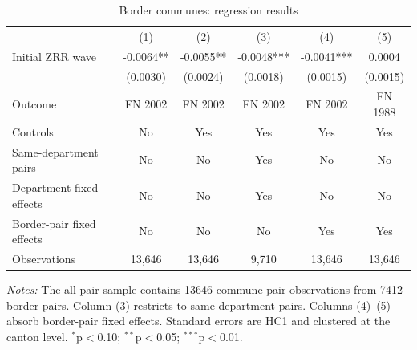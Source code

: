 \begin{table}[!htbp]
\centering
\footnotesize
\caption{Border communes: regression results}
\label{tab:border-results}
\begin{tabular}{lccccc}
\hline
 & (1) & (2) & (3) & (4) & (5) \\
Initial ZRR wave & -0.0064** & -0.0055** & -0.0048*** & -0.0041*** & 0.0004 \\
 & (0.0030) & (0.0024) & (0.0018) & (0.0015) & (0.0015) \\
\hline
\hline
Outcome & FN 2002 & FN 2002 & FN 2002 & FN 2002 & FN 1988 \\
Controls & No & Yes & Yes & Yes & Yes \\
Same-department pairs & No & No & Yes & No & No \\
Department fixed effects & No & No & Yes & No & No \\
Border-pair fixed effects & No & No & No & Yes & Yes \\
Observations & 13,646 & 13,646 & 9,710 & 13,646 & 13,646 \\
\hline
\end{tabular}
\parbox{\textwidth}{\footnotesize \textit{Notes:} The all-pair sample contains 13646 commune-pair observations from 7412 border pairs. Column (3) restricts to same-department pairs. Columns (4)--(5) absorb border-pair fixed effects. Standard errors are HC1 and clustered at the canton level. $^{*}$p$<$0.10; $^{**}$p$<$0.05; $^{***}$p$<$0.01.}
\end{table}
